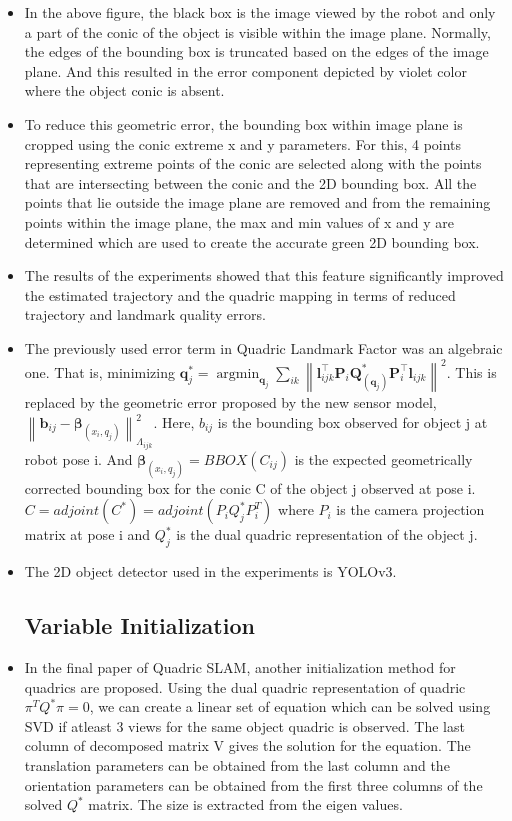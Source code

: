 \documentclass{article}
\begin{document}
\begin{itemize}
    \item In the above figure, the black box is the image viewed by the robot and only a part of the conic of the object is visible within the image plane. Normally, the edges of the bounding box is truncated based on the edges of the image plane. And this resulted in the error component depicted by violet color where the object conic is absent.
    \item To reduce this geometric error, the bounding box within image plane is cropped using the conic extreme x and y parameters. For this, 4 points representing extreme points of the conic are selected along with the points that are intersecting between the conic and the 2D bounding box. All the points that lie outside the image plane are removed and from the remaining points within the image plane, the max and min values of x and y are determined which are used to create the accurate green 2D bounding box.
    \item The results of the experiments showed that this feature significantly improved the estimated trajectory and the quadric mapping in terms of reduced trajectory and landmark quality errors.
    \item The previously used error term in Quadric Landmark Factor was an algebraic one. That is, minimizing $\mathbf{q}_{j}^{*}=\operatorname{argmin}_{\mathbf{q}_{j}} \sum_{i k}\left\|\mathbf{l}_{i j k}^{\top} \mathbf{P}_{i} \mathbf{Q}_{\left(\mathbf{q}_{j}\right)}^{*} \mathbf{P}_{i}^{\top} \mathbf{l}_{i j k}\right\|^{2}$. This is replaced by the geometric error proposed by the new sensor model, $\left\|\mathbf{b}_{i j} - \boldsymbol{\beta} _{(x_i,q_j)}\right\|^{2}_{\Lambda_{i j k}}$. Here, ${b}_{i j}$ is the bounding box observed for object j at robot pose i. And $\boldsymbol{\beta} _{(x_i,q_j)} = BBOX(C_{ij})$ is the expected geometrically corrected bounding box for the conic C of the object j observed at pose i. $C = adjoint(C^*) = adjoint(P_i Q^{*}_j P_i^{T})$ where $P_i$ is the camera projection matrix at pose i and $Q^{*}_j$ is the dual quadric representation of the object j.
    \item The 2D object detector used in the experiments is YOLOv3.
    
\subsection{Variable Initialization}

\item In the final paper of Quadric SLAM\cite{quadric2}, another initialization method for quadrics are proposed. Using the dual quadric representation of quadric $\pi^{T}Q^{*}\pi = 0$, we can create a linear set of equation which can be solved using SVD if atleast 3 views for the same object quadric is observed. The last column of decomposed matrix V gives the solution for the equation. The translation parameters can be obtained from the last column and the orientation parameters can be obtained from the first three columns of the solved $Q^{*}$ matrix. The size is extracted from the eigen values.\cite{quadric2}
\end{itemize}
\end{document}

